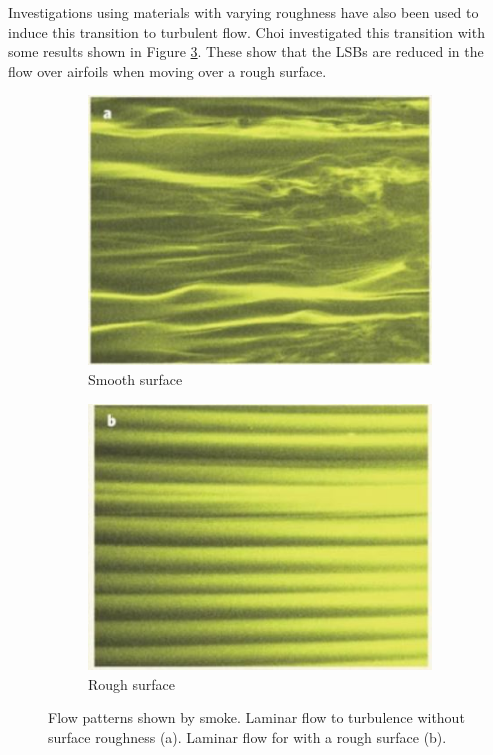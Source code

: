 Investigations using materials with varying roughness have also been used to induce this transition to turbulent flow. Choi investigated this transition with some results shown in Figure \ref{fig:rough}. These show that the \acrshort{LSB}s are reduced in the flow over airfoils when moving over a rough surface.

\begin{figure}[H]
     \centering
     \begin{subfigure}[b]{0.45\textwidth}
         \centering
         \includegraphics[width=\textwidth]{03_LiteratureReview/Figs/a2.JPG}
         \caption{Smooth surface}
         \label{fig:Ps2a}
     \end{subfigure}
     \hfill
     \begin{subfigure}[b]{0.45\textwidth}
         \centering
         \includegraphics[width=\textwidth]{03_LiteratureReview/Figs/b2.JPG}
         \caption{Rough surface}
         \label{fig:Ps2b}
     \end{subfigure}
     \hfill
           \caption{Flow patterns shown by smoke. Laminar flow to turbulence without surface roughness (a). Laminar flow for with a rough surface (b).  \cite{Choi2006}}
  \label{fig:rough}
\end{figure}







